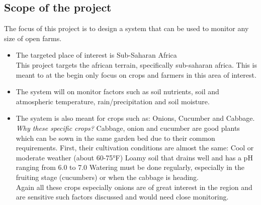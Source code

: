 \documentclass[12pt, a4paper]{article}
\begin{document}
\subsection{Scope of the project}
The focus of this project is to design a system that can be used to monitor any size of open farms.
\begin{itemize}
\item[--] The targeted place of interest is Sub-Saharan Africa\\
This project targets the african terrain, specifically sub-saharan africa. This is meant to at the begin only focus on crops and farmers in this area of interest.
\item[--] The system will on monitor factors such as soil nutrients, soil and atmospheric temperature, rain/precipitation and soil moisture.
\item[--] The syatem is also meant for crops such as: Onions, Cucumber and Cabbage.\\
\emph{Why these specific crops?}
Cabbage, onion and cucumber are good plants which can be sown in the same garden bed due to their common requirements. First, their cultivation conditions are almost the same: Cool or moderate weather (about 60-75°F) Loamy soil that drains well and has a pH ranging from 6.0 to 7.0 Watering must be done regularly, especially in the fruiting stage (cucumbers) or when the cabbage is heading.\\
Again all these crops especially onions are of great interest in the region and are sensitive such factors discussed and would need close monitoring.
\end{itemize}

\newpage
\end{document}
